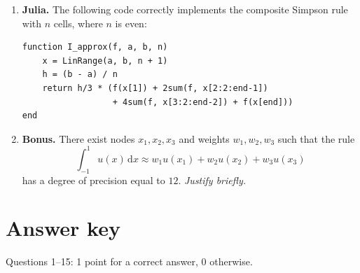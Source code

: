 \documentclass[a4paper]{article}
\renewcommand{\d}{\mathrm d}
\begin{document}
\begin{enumerate}
    \item
        \textbf{Julia.}
        The following code correctly implements the composite Simpson rule with $n$ cells, where $n$ is even:
        \begin{verbatim}
function I_approx(f, a, b, n)
    x = LinRange(a, b, n + 1)
    h = (b - a) / n
    return h/3 * (f(x[1]) + 2sum(f, x[2:2:end-1])
                  + 4sum(f, x[3:2:end-2]) + f(x[end]))
end
        \end{verbatim}

    \item \textbf{Bonus.}
        There exist nodes $x_1, x_2, x_3$ and weights $w_1, w_2, w_3$ such that the rule
        \[
            \int_{-1}^{1} u(x) \, \d x \approx w_1 u(x_1) + w_2 u(x_2) + w_3 u(x_3)
        \]
        has a degree of precision equal to $12$.
        \emph{Justify briefly.}

\end{enumerate}

\ifdefined\showsolutions
\newpage
{}
\section*{Answer key}
\noindent Questions 1--15: 1 point for a correct answer, 0 otherwise.
\end{document}
